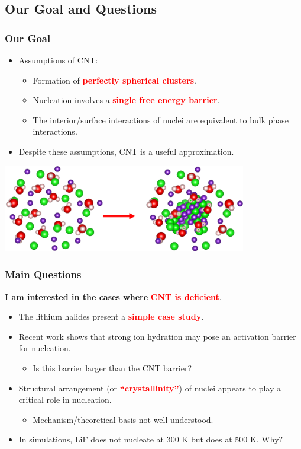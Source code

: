 \documentclass{beamer}
\newcommand{\insertcurrentcitation}{}
\newcommand{\currentcitation}[1]{
	\renewcommand{\insertcurrentcitation}{#1}
} %
\newcommand{\bb}[1]{\textcolor{red}{\textbf{#1}}}
\begin{document}
\subsection{Our Goal and Questions}
\begin{frame}
\frametitle{Our Goal}
\begin{itemize}
	\item Assumptions of CNT:
	\begin{itemize}
		\item Formation of \bb{perfectly spherical clusters}.
		\item Nucleation involves a \bb{single free energy barrier}.
		\item The interior/surface interactions of nuclei are equivalent to bulk phase interactions.
	\end{itemize}
	\item Despite these assumptions, CNT is a useful approximation. 
\end{itemize}
		\begin{center}
			\includegraphics[trim={0cm 0cm 0cm 0cm},clip,width=0.8\textwidth]{figures/Nucleation.png}
		\end{center}
\end{frame}

\currentcitation{\cite{Lanaro2018}}
\begin{frame}
\frametitle{Main Questions}
	\textbf{I am interested in the cases where} \bb{CNT is deficient}. 
\begin{itemize}
	\item The lithium halides present a \bb{simple case study}.
	\pause
	\item Recent work shows that strong ion hydration may pose an activation barrier for nucleation.
	\begin{itemize}
		\item Is this barrier larger than the CNT barrier?
	\end{itemize}
	\pause
	\item Structural arrangement (or \bb{``crystallinity''}) of nuclei appears to play a critical role in nucleation.
	\begin{itemize}
		\item Mechanism/theoretical basis not well understood.
	\end{itemize}
	\pause
	\item In simulations, LiF does not nucleate at 300 K but does at 500 K. Why?
\end{itemize}
\end{frame}
\end{document}
